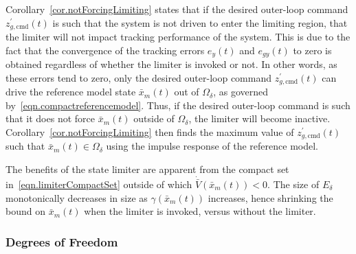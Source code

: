 \begin{rem-dan}
  Corollary~\ref{cor.notForcingLimiting} states that if the desired outer-loop command $z_{g,\text{cmd}}^{\prime}(t)$ is such that the system is not driven to enter the limiting region, that the limiter will not impact tracking performance of the system.
  This is due to the fact that the convergence of the tracking errors $e_{y}(t)$ and $e_{gy}(t)$ to zero is obtained regardless of whether the limiter is invoked or not.
  In other words, as these errors tend to zero, only the desired outer-loop command $z_{g,\text{cmd}}^{\prime}(t)$ can drive the reference model state $\bar{x}_{m}(t)$ out of $\Omega_{\delta}$, as governed by\ \eqref{eqn.compactreferencemodel}.
  Thus, if the desired outer-loop command is such that it does not force $\bar{x}_{m}(t)$ outside of $\Omega_{\delta}$, the limiter will become inactive.
  Corollary~\ref{cor.notForcingLimiting} then finds the maximum value of $z_{g,\text{cmd}}^{\prime}(t)$ such that $\bar{x}_{m}(t)\in\Omega_{\delta}$ using the impulse response of the reference model.
\end{rem-dan}

\begin{rem-dan}
  The benefits of the state limiter are apparent from the compact set in\ \eqref{eqn.limiterCompactSet} outside of which $\dot{\bar{V}}(\bar{x}_{m}(t))<0$.
  The size of $E_{\delta}$ monotonically decreases in size as $\gamma(\bar{x}_{m}(t))$ increases, hence shrinking the bound on $\bar{x}_{m}(t)$ when the limiter is invoked, versus without the limiter.
\end{rem-dan}

\subsubsection{Degrees of Freedom}

